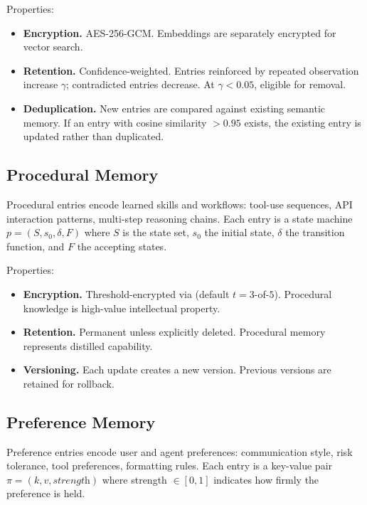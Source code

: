 Properties:
\begin{itemize}
    \item \textbf{Encryption.} AES-256-GCM. Embeddings are separately encrypted for vector search.
    \item \textbf{Retention.} Confidence-weighted. Entries reinforced by repeated observation increase $\gamma$; contradicted entries decrease. At $\gamma < 0.05$, eligible for removal.
    \item \textbf{Deduplication.} New entries are compared against existing semantic memory. If an entry with cosine similarity $> 0.95$ exists, the existing entry is updated rather than duplicated.
\end{itemize}

\subsection{Procedural Memory}

\begin{definition}
Procedural entries encode learned skills and workflows: tool-use sequences, API interaction patterns, multi-step reasoning chains. Each entry is a state machine $p = (S, s_0, \delta, F)$ where $S$ is the state set, $s_0$ the initial state, $\delta$ the transition function, and $F$ the accepting states.
\end{definition}

Properties:
\begin{itemize}
    \item \textbf{Encryption.} Threshold-encrypted via \TChain{} (default $t = 3$-of-$5$). Procedural knowledge is high-value intellectual property.
    \item \textbf{Retention.} Permanent unless explicitly deleted. Procedural memory represents distilled capability.
    \item \textbf{Versioning.} Each update creates a new version. Previous versions are retained for rollback.
\end{itemize}

\subsection{Preference Memory}

\begin{definition}
Preference entries encode user and agent preferences: communication style, risk tolerance, tool preferences, formatting rules. Each entry is a key-value pair $\pi = (k, v, \textit{strength})$ where strength $\in [0, 1]$ indicates how firmly the preference is held.
\end{definition}

